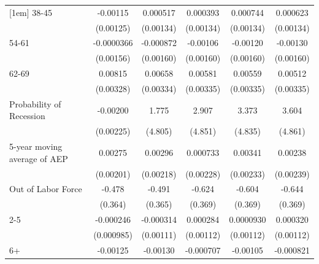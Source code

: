 {\begin{tabular}{l*{5}{c}}
[1em]
38-45               &    -0.00115         &    0.000517         &    0.000393         &    0.000744         &    0.000623         \\
                    &   (0.00125)         &   (0.00134)         &   (0.00134)         &   (0.00134)         &   (0.00134)         \\
[1em]
54-61               &  -0.0000366         &   -0.000872         &    -0.00106         &    -0.00120         &    -0.00130         \\
                    &   (0.00156)         &   (0.00160)         &   (0.00160)         &   (0.00160)         &   (0.00160)         \\
[1em]
62-69               &     0.00815\sym{**} &     0.00658\sym{**} &     0.00581\sym{*}  &     0.00559\sym{*}  &     0.00512         \\
                    &   (0.00328)         &   (0.00334)         &   (0.00335)         &   (0.00335)         &   (0.00335)         \\
[1em]
Probability of Recession&    -0.00200         &       1.775         &       2.907         &       3.373         &       3.604         \\
                    &   (0.00225)         &     (4.805)         &     (4.851)         &     (4.835)         &     (4.861)         \\
[1em]
5-year moving average of AEP&     0.00275         &     0.00296         &    0.000733         &     0.00341         &     0.00238         \\
                    &   (0.00201)         &   (0.00218)         &   (0.00228)         &   (0.00233)         &   (0.00239)         \\
[1em]
Out of Labor Force  &      -0.478         &      -0.491         &      -0.624\sym{*}  &      -0.604         &      -0.644\sym{*}  \\
                    &     (0.364)         &     (0.365)         &     (0.369)         &     (0.369)         &     (0.369)         \\
[1em]
2-5                 &   -0.000246         &   -0.000314         &    0.000284         &   0.0000930         &    0.000320         \\
                    &  (0.000985)         &   (0.00111)         &   (0.00112)         &   (0.00112)         &   (0.00112)         \\
[1em]
6+                  &    -0.00125         &    -0.00130         &   -0.000707         &    -0.00105         &   -0.000821         \\

\end{tabular}}
